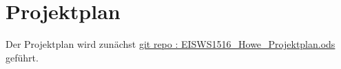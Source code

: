 \chapter{Projektplan}

\begin{comment}
Ein Projektplan wird innerhalb der Projektlaufzeit laufend fortgeführt. Sämtliche Projektaktivitäten werden chronologisch aufgelistet und in Unteraktivitäten gegliedert (mind. drei Gliederungsebenen). Dabei soll zu den Aktivitäten die geplante Zeit gegenüber der tatsächlich verbrauchten Zeit in Stunden angegeben werden. Zudem sollte eine Zuweisung zu den Teammitgliedern erfolgen.
\end{comment}

Der Projektplan wird zunächst \href{https://github.com/thuascgn/EISWS1516Howe/blob/master/EISWS1516_Howe_Projektplan.ods}{git repo : EISWS1516_Howe_Projektplan.ods} geführt.